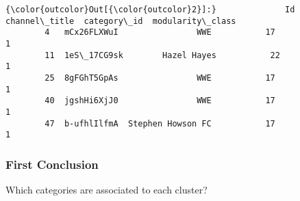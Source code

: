 \documentclass[11pt]{article}
\begin{document}
\begin{Verbatim}[commandchars=\\\{\}]
{\color{outcolor}Out[{\color{outcolor}2}]:}              Id      channel\_title  category\_id  modularity\_class
        4   mCx26FLXWuI                WWE           17                 1
        11  1eS\_17CG9sk        Hazel Hayes           22                 1
        25  8gFGhT5GpAs                WWE           17                 1
        40  jgshHi6XjJ0                WWE           17                 1
        47  b-ufhlIlfmA  Stephen Howson FC           17                 1
\end{Verbatim}
            
    \subsubsection{First Conclusion}\label{first-conclusion}

Which categories are associated to each cluster?
\end{document}
